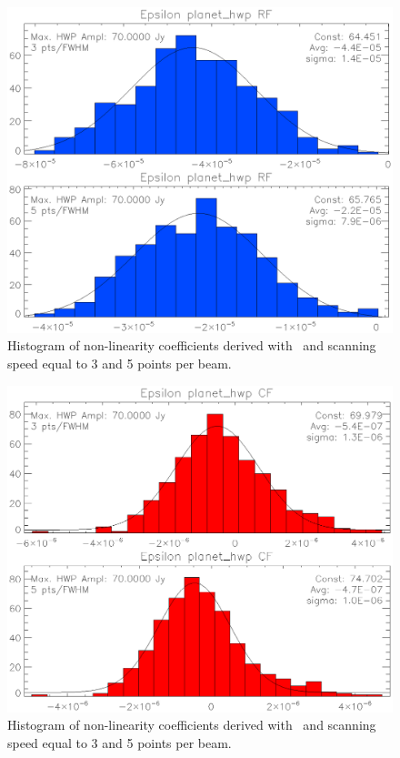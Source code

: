 \begin{figure}
	\includegraphics[clip, angle=0, width=\columnwidth]{Figures/histos_epsilon_rf.eps}
	\caption{Histogram of non-linearity coefficients derived with \methodu\ and scanning speed equal to 3 and 5 points per beam.}
	\label{fig:histos_epsilon_rf}
\end{figure}

\begin{figure}
	\includegraphics[clip, angle=0, width=\columnwidth]{Figures/histos_epsilon_cf.eps}
	\caption{Histogram of non-linearity coefficients derived with \methodd\ and scanning speed equal to 3 and 5 points per beam.}
	\label{fig:histos_epsilon_cf}
\end{figure}


